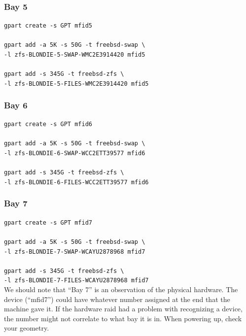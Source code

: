 \subsubsection{Bay 5}
\texttt{gpart create -s GPT mfid5}\\\\
\texttt{gpart add -a 5K -s 50G -t freebsd-swap \textbackslash\\-l \gls{zfs}-BLONDIE-5-SWAP-WMC2E3914420 mfid5}\\\\
\texttt{gpart add -s 345G -t freebsd-zfs \textbackslash\\-l \gls{zfs}-BLONDIE-5-FILES-WMC2E3914420 mfid5}
\subsubsection{Bay 6}
\texttt{gpart create -s GPT mfid6}\\\\
\texttt{gpart add -a 5K -s 50G -t freebsd-swap \textbackslash\\ -l \gls{zfs}-BLONDIE-6-SWAP-WCC2ETT39577 mfid6}\\\\
\texttt{gpart add -s 345G -t freebsd-zfs \textbackslash\\-l \gls{zfs}-BLONDIE-6-FILES-WCC2ETT39577 mfid6}
\subsubsection{Bay 7}
\texttt{gpart create -s GPT mfid7}\\\\
\texttt{gpart add -a 5K -s 50G -t freebsd-swap \textbackslash\\-l \gls{zfs}-BLONDIE-7-SWAP-WCAYU2878968 mfid7}\\\\
\texttt{gpart add -s 345G -t freebsd-zfs \textbackslash\\-l \gls{zfs}-BLONDIE-7-FILES-WCAYU2878968 mfid7}\\

We should note that “Bay 7” is an observation of the physical hardware.  The device (“mfid7”) could have whatever number assigned at the end that the machine gave it.  If the hardware  \gls{raid} had a problem with recognizing a device, the number might not correlate to what bay it is in.  When powering up, check your geometry.

